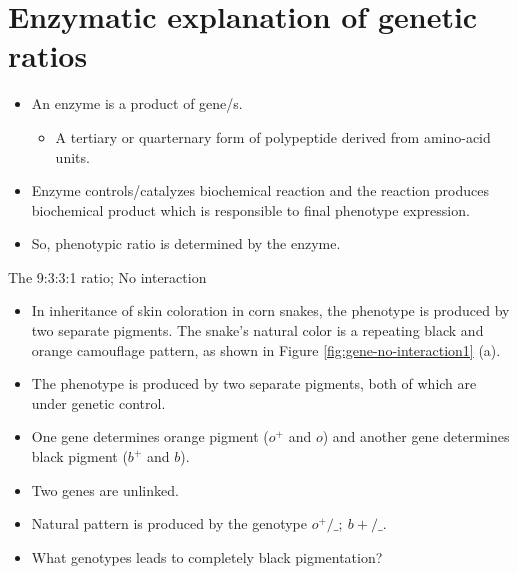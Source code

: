 \documentclass[11pt,dvipsnames,ignorenonframetext,aspectratio=169]{beamer}
\providecommand{\tightlist}{%
  \setlength{\itemsep}{0pt}\setlength{\parskip}{0pt}}
\begin{document}
\hypertarget{enzymatic-explanation-of-genetic-ratios}{%
\section{Enzymatic explanation of genetic
ratios}\label{enzymatic-explanation-of-genetic-ratios}}

\begin{frame}{}
\protect\hypertarget{section-10}{}
\begin{itemize}
\tightlist
\item
  An enzyme is a product of gene/s.

  \begin{itemize}
  \tightlist
  \item
    A tertiary or quarternary form of polypeptide derived from
    amino-acid units.
  \end{itemize}
\item
  Enzyme controls/catalyzes biochemical reaction and the reaction
  produces biochemical product which is responsible to final phenotype
  expression.
\item
  So, phenotypic ratio is determined by the enzyme.
\end{itemize}
\end{frame}

\begin{frame}{The 9:3:3:1 ratio; No interaction}
\protect\hypertarget{the-9331-ratio-no-interaction}{}
\begin{itemize}
\tightlist
\item
  In inheritance of skin coloration in corn snakes, the phenotype is
  produced by two separate pigments. The snake's natural color is a
  repeating black and orange camouflage pattern, as shown in Figure
  \ref{fig:gene-no-interaction1} (a).
\item
  The phenotype is produced by two separate pigments, both of which are
  under genetic control.
\item
  One gene determines orange pigment (\(o^+\) and \(o\)) and another
  gene determines black pigment (\(b^+\) and \(b\)).
\item
  Two genes are unlinked.
\item
  Natural pattern is produced by the genotype \(o^+/\_;\ b+/\_\).
\item
  What genotypes leads to completely black pigmentation?
\end{itemize}
\end{frame}
\end{document}
